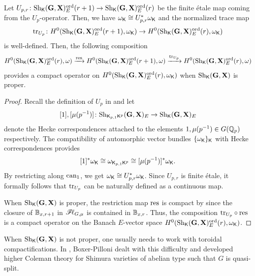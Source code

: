 \documentclass[12pt,reqno]{amsart}
\begin{document}
\begin{prop} \label{prop:compact_Up_operator}
    Let $U_{p, r} \colon {\operatorname{Sh}}_{{\mathsf{K}}}(\mathbf{G}, \mathbf{X})_E^{{\operatorname{ord}}}(r+1) \to {\operatorname{Sh}}_{{\mathsf{K}}}(\mathbf{G}, \mathbf{X})_E^{{\operatorname{ord}}}(r)$ be the finite \'{e}tale map coming from the $U_p$-operator. Then, we have $\omega_{{\mathsf{K}}} \cong U_{p, r}^* \omega_{{\mathsf{K}}}$ and the normalized trace map 
    \[
        {\operatorname{tr}}_{U_p} \colon H^0({\operatorname{Sh}}_{{\mathsf{K}}}(\mathbf{G}, \mathbf{X})_E^{{\operatorname{ord}}}(r+1), \omega_{{\mathsf{K}}}) \to H^0({\operatorname{Sh}}_{{\mathsf{K}}}(\mathbf{G}, \mathbf{X})_E^{{\operatorname{ord}}}(r), \omega_{{\mathsf{K}}})
    \]
    is well-defined. Then, the following composition
    \[
        H^0({\operatorname{Sh}}_{{\mathsf{K}}}(\mathbf{G}, \mathbf{X})_E^{{\operatorname{ord}}}(r), \omega) \xrightarrow{{\operatorname{res}}} H^0({\operatorname{Sh}}_{{\mathsf{K}}}(\mathbf{G}, \mathbf{X})_E^{{\operatorname{ord}}}(r+1), \omega) \xrightarrow{{\operatorname{tr}}_{U_p}} H^0({\operatorname{Sh}}_{{\mathsf{K}}}(\mathbf{G}, \mathbf{X})_E^{{\operatorname{ord}}}(r), \omega)
    \]
    provides a compact operator on $H^0({\operatorname{Sh}}_{{\mathsf{K}}}(\mathbf{G}, \mathbf{X})_E^{{\operatorname{ord}}}(r), \omega_{{\mathsf{K}}})$ when ${\operatorname{Sh}}_{{\mathsf{K}}}(\mathbf{G}, \mathbf{X})$ is proper. 
\end{prop}
\begin{proof}
    Recall the definition of $U_p$ in  and let
    \[
        [1], [\mu(p^{-1})] \colon {\operatorname{Sh}}_{{\mathsf{K}}_{p, 1} {\mathsf{K}}^p}(\mathbf{G}, \mathbf{X})_E \to {\operatorname{Sh}}_{{\mathsf{K}}}(\mathbf{G}, \mathbf{X})_E
    \]
    denote the Hecke correspondences attached to the elements $1, \mu(p^{-1}) \in G(\mathbb{Q}_p)$ respectively. The compatibility of automorphic vector bundles $\{ \omega_{{\mathsf{K}}} \}_{{\mathsf{K}}}$ with Hecke correspondences provides
    \[
        [1]^* \omega_{{\mathsf{K}}} \cong \omega_{{\mathsf{K}}_{p, 1} {\mathsf{K}}^p} \cong [\mu(p^{-1})]^* \omega_{{\mathsf{K}}}.
    \]
    By restricting along ${\operatorname{can}}_1$, we get $\omega_{{\mathsf{K}}} \cong U_{p, r}^* \omega_{{\mathsf{K}}}$. Since $U_{p, r}$ is finite \'{e}tale, it formally follows that ${\operatorname{tr}}_{U_p}$ can be naturally defined as a continuous map. 

    When ${\operatorname{Sh}}_{{\mathsf{K}}}(\mathbf{G}, \mathbf{X})$ is proper, the restriction map ${\operatorname{res}}$ is compact by \cite[Lemma 2.5.23]{BP21} since the closure of $\mathbb{B}_{x, r + 1}$ in ${\mathscr{F}\!\ell}_{G, \mu}$ is contained in $\mathbb{B}_{x, r}$. Thus, the composition ${\operatorname{tr}}_{U_p} \circ {\operatorname{res}}$ is a compact operator on the Banach $E$-vector space $H^0({\operatorname{Sh}}_{{\mathsf{K}}}(\mathbf{G}, \mathbf{X})_E^{{\operatorname{ord}}}(r), \omega_{{\mathsf{K}}})$. 
\end{proof}
\begin{rmk}
    When ${\operatorname{Sh}}_{{\mathsf{K}}}(\mathbf{G}, \mathbf{X})$ is not proper, one usually needs to work with toroidal compactifications. In \cite{BP21}, Boxer-Pilloni dealt with this difficulty and developed higher Coleman theory for Shimura varieties of abelian type such that $G$ is quasi-split. 
\end{rmk}
\end{document}
